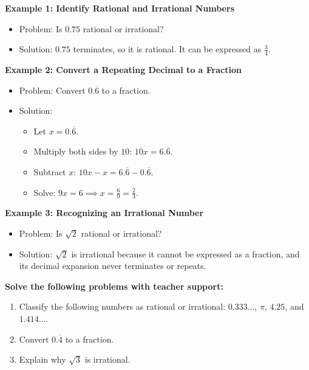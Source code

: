\documentclass[12pt]{article}
\begin{document}
\begin{tcolorbox}[colframe=black!60, colback=white, 
coltitle=black, colbacktitle=black!15, fonttitle=\bfseries\Large, 
title=Examples, halign title=center, left=10pt, right=10pt, top=10pt, bottom=15pt]
\textbf{Example 1: Identify Rational and Irrational Numbers}
\begin{itemize}
    \item Problem: Is \(0.75\) rational or irrational?
    \item Solution: \(0.75\) terminates, so it is rational. It can be expressed as \(\frac{3}{4}\).
\end{itemize}

\textbf{Example 2: Convert a Repeating Decimal to a Fraction}
\begin{itemize}
    \item Problem: Convert \(0.\overline{6}\) to a fraction.
    \item Solution:
    \begin{itemize}
        \item Let \(x = 0.\overline{6}\).
        \item Multiply both sides by \(10\): \(10x = 6.\overline{6}\).
        \item Subtract \(x\): \(10x - x = 6.\overline{6} - 0.\overline{6}\).
        \item Solve: \(9x = 6 \implies x = \frac{6}{9} = \frac{2}{3}\).
    \end{itemize}
\end{itemize}

\textbf{Example 3: Recognizing an Irrational Number}
\begin{itemize}
    \item Problem: Is \(\sqrt{2}\) rational or irrational?
    \item Solution: \(\sqrt{2}\) is irrational because it cannot be expressed as a fraction, and its decimal expansion never terminates or repeats.
\end{itemize}
\end{tcolorbox}

\begin{tcolorbox}[colframe=black!60, colback=white, 
coltitle=black, colbacktitle=black!15, fonttitle=\bfseries\Large, 
title=Guided Practice, halign title=center, left=10pt, right=10pt, top=10pt, bottom=15pt]
\textbf{Solve the following problems with teacher support:}
\begin{enumerate}[itemsep=3em]
    \item Classify the following numbers as rational or irrational: \(0.333...\), \(\pi\), \(4.25\), and \(1.414...\).
    \item Convert \(0.\overline{4}\) to a fraction.
    \item Explain why \(\sqrt{3}\) is irrational.
\end{enumerate}
\end{tcolorbox}
\end{document}
